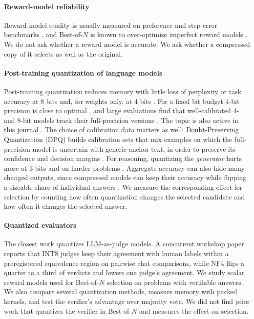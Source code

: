 \paragraph{Reward-model reliability} Reward-model quality is usually measured on
preference and step-error benchmarks \cite{lambert2024rewardbench,zheng2024processbench,
song2025prmbench}, and Best-of-$N$ is known to over-optimise imperfect reward models
\cite{gao2023overoptimization}. We do not ask whether a reward model is accurate. We ask
whether a compressed copy of it selects as well as the original.

\paragraph{Post-training quantization of language models} Post-training quantization
reduces memory with little loss of perplexity or task accuracy at 8 bits
\cite{dettmers2022llmint,xiao2022smoothquant} and, for weights only, at 4 bits
\cite{frantar2023gptq,lin2024awq,dettmers2023qlora}. For a fixed bit budget 4-bit
precision is close to optimal \cite{dettmers2022the}, and large evaluations find that
well-calibrated 4- and 8-bit models track their full-precision versions
\cite{kurtic2024give}. The topic is also active in this journal
\cite{zhu2027rotsq,bang2027bvsr}. The choice of calibration data matters as well:
Doubt-Preserving Quantization (DPQ) builds calibration sets that mix examples on which
the full-precision model is uncertain with generic anchor text, in order to preserve its
confidence and decision margins \cite{yang2026dpq}. For reasoning, quantizing the \emph{generator} hurts more at 3 bits
and on harder problems \cite{liu2025quantization,li2025quantization}. Aggregate
accuracy can also hide many changed outputs, since compressed models can keep their
accuracy while flipping a sizeable share of individual answers
\cite{dutta2024accuracy}. We measure the corresponding effect for selection by counting
how often quantization changes the selected candidate and how often it changes the
selected answer.

\paragraph{Quantized evaluators} The closest work quantizes LLM-as-judge models. A
concurrent workshop paper \cite{patira2026judges} reports that INT8 judges keep their
agreement with human labels within a preregistered equivalence region on pairwise chat
comparisons, while NF4 flips a quarter to a third of verdicts and lowers one judge's
agreement. We study scalar reward models used for Best-of-$N$ selection on problems with
verifiable answers. We also compare several quantization methods, measure memory with
packed kernels, and test the verifier's advantage over majority vote. We did not find
prior work that quantizes the verifier in Best-of-$N$ and measures the effect on
selection.

